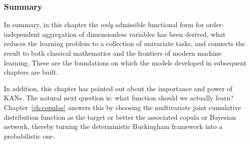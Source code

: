 \subsubsection*{Summary}
In summary, in this chapter the \emph{only} admissible functional form for order-independent aggregation of dimensionless variables has been derived, what reduces the learning problem to a collection of univariate tasks, and connects the result to both classical mathematics and the frontiers of modern machine learning. These are the foundations on which the models developed in subsequent chapters are built.


In addition, this chapter has pointed out about the importance and power of KANs.  The natural next question is: what function should we actually learn? Chapter~\ref{ch:copulas} answers this by choosing the multivariate joint cumulative distribution function as the target or better the associated copula or Bayesian network, thereby turning the deterministic Buckingham framework into a probabilistic one.

